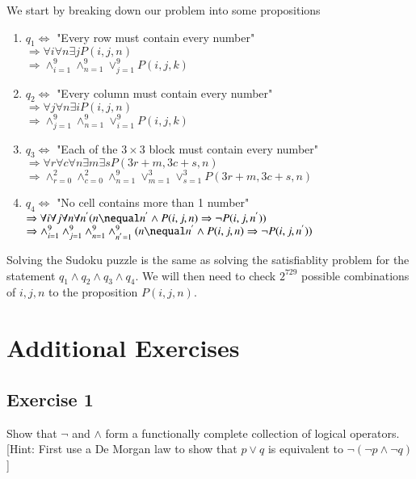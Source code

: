 \documentclass{article}
\begin{document}
\noindent We start by breaking down our problem into some propositions
\begin{enumerate}
	\item $q_{1} \Leftrightarrow$ "Every row must contain every number" \\ $\Rightarrow \forall i \forall n \exists j P(i,j,n)$ \\
	      $\Rightarrow \wedge_{i=1}^{9} \wedge_{n=1}^{9} \vee_{j=1}^{9} P(i,j,k)$
	\item $q_{2} \Leftrightarrow$ "Every column must contain every number" \\ $\Rightarrow \forall j \forall n \exists i P(i,j,n)$ \\
	      $\Rightarrow \wedge_{j=1}^{9} \wedge_{n=1}^{9} \vee_{i=1}^{9} P(i,j,k)$
	\item $q_{3} \Leftrightarrow$ "Each of the $3 \times 3$ block must contain every number" \\
	      $\Rightarrow \forall r \forall c \forall n \exists m \exists s P(3r+m, 3c+s, n)$ \\
	      $\Rightarrow \wedge_{r=0}^{2} \wedge_{c=0}^{2} \wedge_{n=1}^{9} \vee_{m=1}^{3} \vee_{s=1}^{3}P(3r+m, 3c+s, n)$
	\item $q_{4} \Leftrightarrow$ "No cell contains more than 1 number" \\
	      $\Rightarrow \forall i \forall j \forall n \forall n^{'}(n \nequal n^{'} \wedge P(i,j,n) \Rightarrow \neg P(i,j,n^{'}))$ \\
	      $\Rightarrow \wedge_{i=1}^9 \wedge_{j=1}^9 \wedge_{n=1}^9 \wedge_{n^{'}=1}^9 (n \nequal n^{'} \wedge P(i,j,n) \Rightarrow \neg P(i,j,n^{'}))$
\end{enumerate}

\noindent Solving the Sudoku puzzle is the same as solving the satisfiablity problem for the statement $q_{1} \wedge q_{2} \wedge q_{3} \wedge q_{4}$.
We will then need to check $2^{729}$ possible combinations of $i, j, n$ to the proposition $P(i,j,n)$.

\section{Additional Exercises}
\subsection*{Exercise 1}
Show that $\neg$ and $\wedge$ form a functionally complete collection of logical operators. [Hint: First use a De Morgan law
		to show that $p \vee q$ is equivalent to $\neg (\neg p \wedge \neg q)$]
\end{document}
